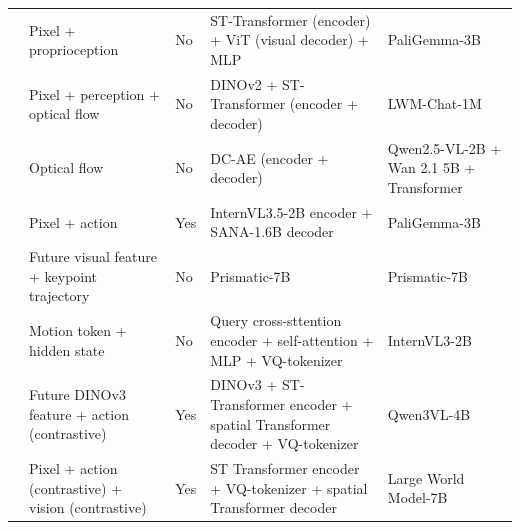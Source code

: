 \documentclass[Afour,sageh,times]{sagej}
\begin{document}
\begin{table}[t]
\begin{tabularx}{\linewidth}{p{2.8cm}p{3.3cm}p{1.8cm}X X}
\cite{chen2025villa} & Pixel + proprioception & No & ST-Transformer (encoder) + ViT (visual decoder) + MLP & PaliGemma-3B \\
\cite{routray2025vipra} & Pixel + perception + optical flow  & No & DINOv2 + ST-Transformer (encoder + decoder) & LWM-Chat-1M \\
\cite{bi2025motus} & Optical flow & No & DC-AE (encoder + decoder) & Qwen2.5-VL-2B + Wan 2.1 5B + Transformer \\
\cite{li2025latbot} & Pixel + action & Yes & InternVL3.5-2B encoder + SANA-1.6B decoder & PaliGemma-3B \\
\cite{shi2026care} & Future visual feature + keypoint trajectory & No & Prismatic-7B & Prismatic-7B \\
\cite{luo2026joint} & Motion token + hidden state & No & Query cross-sttention encoder + self-attention + MLP + VQ-tokenizer & InternVL3-2B \\
\cite{zhang2026clap} & Future DINOv3 feature + action (contrastive) & Yes & DINOv3 + ST-Transformer encoder + spatial Transformer decoder + VQ-tokenizer & Qwen3VL-4B \\
\cite{dai2026conla} & Pixel + action (contrastive) + vision (contrastive) & Yes & ST Transformer encoder + VQ-tokenizer + spatial Transformer decoder & Large World Model-7B \\
\bottomrule
\end{tabularx}
\end{table}
\end{document}
